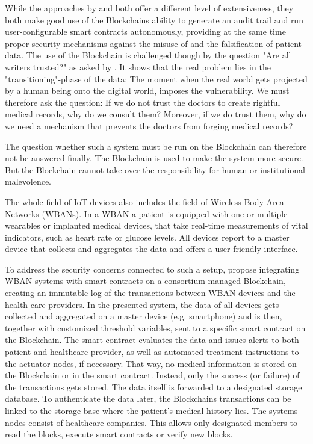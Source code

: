 While the approaches by \cite{Cao2019} and \cite{Azaria2016} both offer a different level of extensiveness, they both make good use of the Blockchains ability to generate an audit trail and run user-configurable smart contracts autonomously, providing at the same time proper security mechanisms against the misuse of and the falsification of patient data.
The use of the Blockchain is challenged though by the question "Are all writers trusted?" as asked by \cite{Wust2017}. It shows that the real problem lies in the "transitioning"-phase of the data: The moment when the real world gets projected by a human being onto the digital world, imposes the vulnerability. We must therefore ask the question: If we do not trust the doctors to create rightful medical records, why do we consult them? Moreover, if we do trust them, why do we need a mechanism that prevents the doctors from forging medical records?

The question whether such a system must be run on the Blockchain can therefore not be answered finally. The Blockchain is used to make the system more secure. But the Blockchain cannot take over the responsibility for human or institutional malevolence.

The whole field of IoT devices also includes the field of Wireless Body Area Networks (WBANs). In a WBAN a patient is equipped with one or multiple wearables or implanted medical devices, that take real-time measurements of vital indicators, such as heart rate or glucose levels. All devices report to a master device that collects and aggregates the data and offers a user-friendly interface.

To address the security concerns connected to such a setup, \cite{Baccarini2018} propose integrating WBAN systems with smart contracts on a consortium-managed Blockchain, creating an immutable log of the transactions between WBAN devices and the health care providers. \cite{Baccarini2018} 
In the presented system, the data of all devices gets collected and aggregated on a master device (e.g. smartphone) and is then, together with customized threshold variables, sent to a specific smart contract on the Blockchain. The smart contract evaluates the data and issues alerts to both patient and healthcare provider, as well as automated treatment instructions to the actuator nodes, if necessary.
That way, no medical information is stored on the Blockchain or in the smart contract. Instead, only the success (or failure) of the transactions gets stored. The data itself is forwarded to a designated storage database.
To authenticate the data later, the Blockchains transactions can be linked to the storage base where the patient's medical history lies.
The systems nodes consist of healthcare companies. This allows only designated members to read the blocks, execute smart contracts or verify new blocks.

